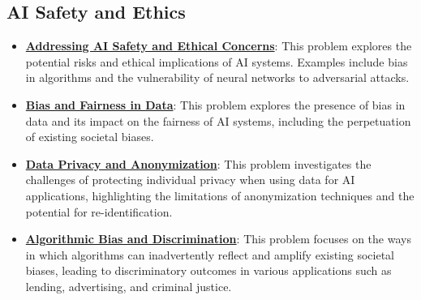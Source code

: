 \documentclass{article}%
\begin{document}
\subsection{AI Safety and Ethics}%
\label{subsec:AISafetyandEthics}%
\begin{itemize}[leftmargin=*]%
\item \href{https://purdue.brightspace.com/d2l/common/assets/pdfjs-d2l-dist/1.0.14-legacy/web/viewer.html?file=%2Fcontent%2Fenforced%2F1095467-wl.202510.CS.24300.001%2F02L2-Intro.pdf%3Fou%3D1095467&lang=en-us&container=d2l-fileviewer-rendered-pdf&fullscreen=d2l-fileviewer-rendered-pdf-dialog&height=667#page=19}{\textbf{Addressing AI Safety and Ethical Concerns}}: This problem explores the potential risks and ethical implications of AI systems. Examples include bias in algorithms and the vulnerability of neural networks to adversarial attacks.%
\item \href{https://purdue.brightspace.com/d2l/common/assets/pdfjs-d2l-dist/1.0.14-legacy/web/viewer.html?file=%2Fcontent%2Fenforced%2F1095467-wl.202510.CS.24300.001%2F16L2-ethics.pdf%3Fou%3D1095467&lang=en-us&container=d2l-fileviewer-rendered-pdf&fullscreen=d2l-fileviewer-rendered-pdf-dialog&height=667#page=2}{\textbf{Bias and Fairness in Data}}: This problem explores the presence of bias in data and its impact on the fairness of AI systems, including the perpetuation of existing societal biases.%
\item \href{https://purdue.brightspace.com/d2l/common/assets/pdfjs-d2l-dist/1.0.14-legacy/web/viewer.html?file=%2Fcontent%2Fenforced%2F1095467-wl.202510.CS.24300.001%2F16L2-ethics.pdf%3Fou%3D1095467&lang=en-us&container=d2l-fileviewer-rendered-pdf&fullscreen=d2l-fileviewer-rendered-pdf-dialog&height=667#page=10}{\textbf{Data Privacy and Anonymization}}: This problem investigates the challenges of protecting individual privacy when using data for AI applications, highlighting the limitations of anonymization techniques and the potential for re-identification.%
\item \href{https://purdue.brightspace.com/d2l/common/assets/pdfjs-d2l-dist/1.0.14-legacy/web/viewer.html?file=%2Fcontent%2Fenforced%2F1095467-wl.202510.CS.24300.001%2F16L2-ethics.pdf%3Fou%3D1095467&lang=en-us&container=d2l-fileviewer-rendered-pdf&fullscreen=d2l-fileviewer-rendered-pdf-dialog&height=667#page=12}{\textbf{Algorithmic Bias and Discrimination}}: This problem focuses on the ways in which algorithms can inadvertently reflect and amplify existing societal biases, leading to discriminatory outcomes in various applications such as lending, advertising, and criminal justice.%

\end{itemize}
\end{document}
